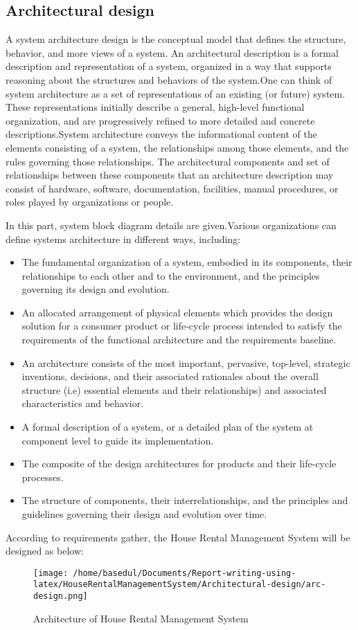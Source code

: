 \documentclass[12pt,a4paper]{article}
\newcommand\tab[1][.7cm]{\hspace*{#1}}
\begin{document}
\subsection{Architectural design}
\tab A system architecture \cite{Ref:11} design is the conceptual model that defines the structure, behavior, and more views of a system. An architectural description is a formal description and representation of a system, organized in a way that supports reasoning about the structures and behaviors of the system.One can think of system architecture as a set of representations of an existing (or future) system. These representations initially describe a general, high-level functional organization, and are progressively refined to more detailed and concrete descriptions.System architecture conveys the informational content of the elements consisting of a system, the relationships among those elements, and the rules governing those relationships. The architectural components and set of relationships between these components that an architecture description may consist of hardware, software, documentation, facilities, manual procedures, or roles played by organizations or people.{In this part, system block diagram details are given.Various organizations can define systems architecture in different ways, including:\begin{itemize}
	\item The fundamental organization of a system, embodied in its components, their relationships to each other and to the environment, and the principles governing its design and evolution.
	\item An allocated arrangement of physical elements which provides the design solution for a consumer product or life-cycle process intended to satisfy the requirements of the functional architecture and the requirements baseline.
	\item An architecture consists of the most important, pervasive, top-level, strategic inventions, decisions, and their associated rationales about the overall structure (i.e) essential elements and their relationships) and associated characteristics and behavior.
	\item A formal description of a system, or a detailed plan of the system at component level to guide its implementation.
	\item The composite of the design architectures for products and their life-cycle processes.
	\item The structure of components, their interrelationships, and the principles and guidelines governing their design and evolution over time.
\end{itemize}According to requirements
gather, the House Rental Management System will be designed as below:}
	\begin{figure}[H]
		\centering
		\texttt{[image: /home/basedul/Documents/Report-writing-using-latex/HouseRentalManagementSystem/Architectural-design/arc-design.png]}
		\caption{\hspace{0.35em}Architecture of House Rental Management System}
		\label{fig:archi} 
	\end{figure}
		
\end{document}
